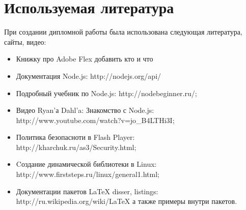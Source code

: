 \chapter{Используемая литература}
При создании дипломной работы была использована следующая литература, сайты, видео:
\begin{itemize}
  \item  Книжку про Adobe Flex добавить кто и что
  \item  Документация Node.js: http://nodejs.org/api/
  \item Подробный учебник по Node.js: http://nodebeginner.ru/;
  \item Видео Ryan'а Dahl'a: Знакомство с Node.js: \\
http://www.youtube.com/watch?v=jo\_B4LTHi3I;
  \item Политика безопасноти в Flash Player:\\ http://kharchuk.ru/as3/Security.html;
  \item Cоздание динамической библиотеки в Linux:\\ http://www.firststeps.ru/linux/general1.html;
  \item Документации пакетов LaTeX disser, listings:\\ http://ru.wikipedia.org/wiki/LaTeX а также примеры внутри пакетов.
\end{itemize}